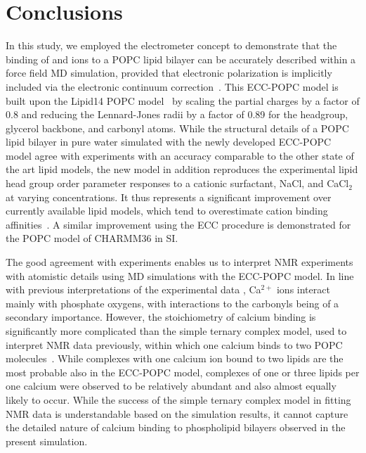 \documentclass[journal=jpcbfk,manuscript=article]{achemso}
\begin{document}
\section{Conclusions}

In this study, we employed the electrometer concept to demonstrate that the binding of  and  ions to a POPC lipid bilayer can be accurately described within a force field MD simulation, provided that electronic polarization is implicitly included via the electronic continuum correction~\cite{leontyev11}. This ECC-POPC model is built upon the Lipid14 POPC model~\cite{dickson14} by scaling the partial charges by a factor of 0.8 and reducing the Lennard-Jones radii by a factor of 0.89 for the headgroup, glycerol backbone, and carbonyl atoms. While the structural details of a POPC lipid bilayer in pure water simulated with the newly developed ECC-POPC model agree with experiments with an accuracy comparable to the other state of the art lipid models, the new model in addition reproduces the experimental lipid head group order parameter responses to a cationic surfactant, NaCl, and CaCl$_2$ at varying concentrations. It thus represents a significant improvement over currently available lipid models, which tend to overestimate cation binding affinities~\cite{catte16}.
A similar improvement using the ECC procedure is demonstrated for the POPC model of CHARMM36 \cite{klauda10} in SI.

The good agreement with experiments enables us to interpret NMR experiments with atomistic details using MD simulations with the ECC-POPC model. In line with previous interpretations of the experimental data \cite{hauser76,hauser78,herbette84,binder02}, Ca$^{2+}$ ions interact mainly with phosphate oxygens, with interactions to the carbonyls being of a secondary importance. However, the stoichiometry of calcium binding is significantly more complicated than the simple ternary complex model, used to interpret NMR data previously, within which one calcium binds to two POPC molecules~\cite{altenbach84}. While complexes with one calcium ion bound to two lipids are the most probable also in the ECC-POPC model, complexes of one or three lipids per one calcium were observed to be relatively abundant and also almost equally likely to occur. While the success of the simple ternary complex model in fitting NMR data is understandable based on the simulation results, it cannot capture the detailed nature of calcium binding to phospholipid bilayers observed in the present simulation.
\end{document}
